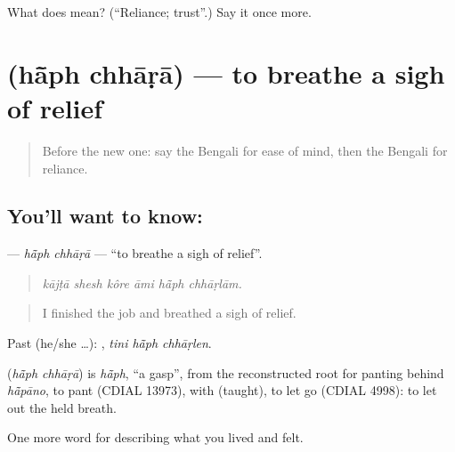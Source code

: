\begin{tcolorbox}[breakable,colback=teal!4,colframe=teal!35!black,title={Before you move on}]
What does  mean? (\textquotedblleft{}Reliance; trust\textquotedblright{}.) Say it once more.
\end{tcolorbox}
\section[\texorpdfstring{\bn{হাঁফ} \bn{ছাড়া} (hā̃ph chhāṛā)}{হাঁফ ছাড়া (hā̃ph chhāṛā)}]{  (hā̃ph chhāṛā) — to breathe a sigh of relief}

\label{lesson:BN-C446-haph-chhara}



\begin{quote}
Before the new one: say the Bengali for ease of mind, then the Bengali for reliance.
\end{quote}

\subsection*{You'll want to know:  }
\textbf{ } — \emph{hā̃ph chhāṛā} — \textquotedblleft{}to breathe a sigh of relief\textquotedblright{}.

\begin{quote}
     
\end{quote}

\begin{quote}
\emph{kājṭā shesh kôre āmi hā̃ph chhāṛlām.}
\end{quote}

\begin{quote}
I finished the job and breathed a sigh of relief.
\end{quote}

Past (he/she …):   , \emph{tini hā̃ph chhāṛlen}.

\begin{cousinweb}
\textbf{ } (\emph{hā̃ph chhāṛā}) is \emph{hā̃ph}, \textquotedblleft{}a gasp\textquotedblright{}, from the reconstructed root for panting behind \emph{hā̃pāno}, to pant (CDIAL 13973), with  (taught), to let go (CDIAL 4998): to let out the held breath.
\end{cousinweb}

\begin{grammarlens}[title={What you've built}]
One more word for describing what you lived and felt.
\end{grammarlens}

